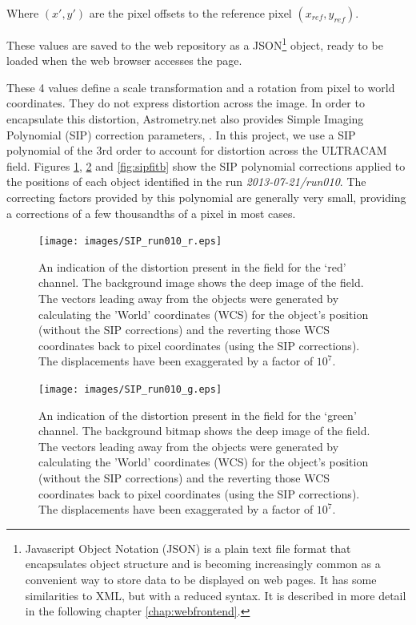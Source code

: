 Where $(x', y')$ are the pixel offsets to the reference pixel $(x_{ref}, y_{ref})$.

These values are saved to the web repository as a JSON\footnote{Javascript Object Notation (JSON) is a plain text file format that encapsulates object structure and is becoming increasingly common as a convenient way to store data to be displayed on web pages. It has some similarities to XML, but with a reduced syntax. It is described in more detail in the following chapter \ref{chap:webfrontend}.} object, ready to be loaded when the web browser accesses the page. 

These 4 values define a scale transformation and a rotation from pixel to world coordinates. They do not express distortion across the image. In order to encapsulate this distortion, Astrometry.net also provides Simple Imaging Polynomial (SIP) correction parameters, \citep{sippolynomial}. In this project, we use a SIP polynomial of the 3rd order to account for distortion across the ULTRACAM field. Figures \ref{fig:sipfitr}, \ref{fig:sipfitg} and \ref{fig:sipfitb} show the SIP polynomial corrections applied to the positions of each object identified in the run \emph{2013-07-21/run010}. The correcting factors provided by this polynomial are generally very small, providing a corrections of a few thousandths of a pixel in most cases. 

\begin{figure}
  \centering
  \texttt{[image: images/SIP\_run010\_r.eps]}
  \caption{An indication of the distortion present in the field for the `red' channel. The background image shows the deep image of the field. The vectors leading away from the objects were generated by calculating the 'World' coordinates (WCS) for the object's position (without the SIP corrections) and the reverting those WCS coordinates back to pixel coordinates (using the SIP corrections). The displacements have been exaggerated by a factor of $10^7$.}
\label{fig:sipfitr}
\end{figure}
  
\begin{figure}
  \centering
  \texttt{[image: images/SIP\_run010\_g.eps]}
  \caption{An indication of the distortion present in the field for the `green' channel. The background bitmap shows the deep image of the field. The vectors leading away from the objects were generated by calculating the 'World' coordinates (WCS) for the object's position (without the SIP corrections) and the reverting those WCS coordinates back to pixel coordinates (using the SIP corrections). The displacements have been exaggerated by a factor of $10^7$.}
\label{fig:sipfitg}
\end{figure}
  
